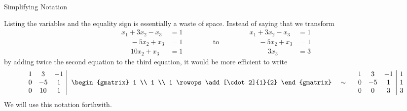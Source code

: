 \documentclass[smaller,hyperref={CJKbookmarks=true}]{beamer}
\begin{document}
\begin{frame}{Simplifying Notation} \begin{spacing}{1.1}
Listing the variables and the equality sign is essentially a waste of space.
Instead of saying that we transform
\begin{equation*}
  \begin{aligned}
  x_1+3x_2-x_3&=1\\
  ~~~~~~-5x_2+x_3&=1\\
  ~~~~~~10x_2+x_3&=1
  \end{aligned}
  \qquad\qquad\text{to}\qquad\qquad
  \begin{aligned}
  x_1+3x_2-x_3 &=1 \\
     ~~~~~~-5x_2+x_3 &=1 \\
     ~~~~~~~~~~~~3x_3 &=3
  \end{aligned}
\end{equation*}
by adding twice the second equation to the third equation, it would be
more ef{}ficient to write
\vspace*{3mm}
\begin{equation*}
\renewcommand{\arraystretch}{1}
  \begin{array}{ccc|}
    1 & 3 & -1 \\
    0 & -5 & 1 \\
    0 & 10 & 1
  \end{array}~~
  \begin{gmatrix}
    1 \\ 1 \\ 1
    \rowops
    \add[\cdot2]{1}{2}
  \end{gmatrix}
  \quad\sim\quad
  \begin{array}{ccc|c}
    1 & 3 & -1 & 1 \\
    0 & -5 & 1 & 1 \\
    0 & 0 & 3 & 3
  \end{array}
\end{equation*}
We will use this notation forthwith.
\end{spacing}
\end{frame}
\end{document}
